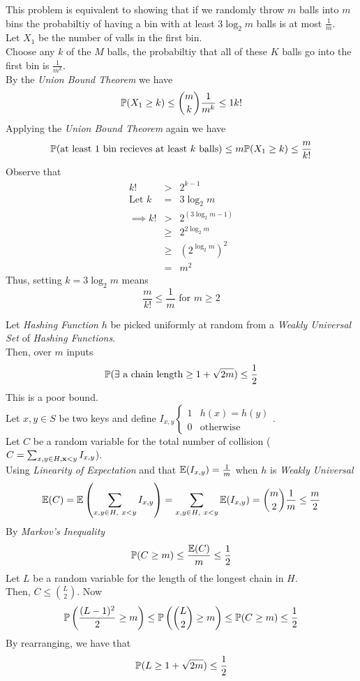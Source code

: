 \documentclass[11pt,a4paper]{article}
\begin{document}
This problem is equivalent to showing that if we randomly throw $m$ balls into $m$ bins the probabiltiy of having a bin with at least $3\log_2 m$ balls is at most $\frac1m$.\\
Let $X_1$ be the number of valls in the first bin.\\
Choose any $k$ of the $M$ balls, the probabiltiy that all of these $K$ balls go into the first bin is $\frac1{m^k}$.\\
By the \textit{Union Bound Theorem} we have
$$\mathbb{P}(X_1\geq k)\leq{m\choose k}\frac{1}{m^k}\leq1{k!}$$
Applying the \textit{Union Bound Theorem} again we have
$$\mathbb{P}(\text{at least 1 bin recieves at least }k\text{ balls})\leq m\mathbb{P}(X_1\geq k)\leq\frac{m}{k!}$$
Observe that
\[\begin{array}{rcl}
k!&>&2^{k-1}\\
\text{Let }k&=&3\log_2 m\\
\implies k!&>&2^{(3\log_2m-1)}\\
&\geq&2^{2\log_2 m}\\
&\geq&(2^{\log_2 m})^2\\
&=&m^2
\end{array}\]
Thus, setting $k=3\log_2 m$ means
$$\frac{m}{k!}\leq\frac1m\text{ for }m\geq2$$
\proved

Let \textit{Hashing Function} $h$ be picked uniformly at random from a \textit{Weakly Universal Set} of \textit{Hashing Functions}.\\
Then, over $m$ inputs
$$\mathbb{P}(\exists\text{ a chain length}\geq1+\sqrt{2m})\leq\frac12$$
\nb This is a poor bound.\\

Let $x,y\in S$ be two keys and define $I_{x,y}\begin{cases}1&h(x)=h(y)\\0&\text{otherwise}\end{cases}$.\\
Let $C$ be a random variable for the total number of collision (\ie $C=\sum_{x,y\in H, \textbf{x}<y}I_{x,y}$).\\
Using \textit{Linearity of Expectation} and that $\mathbb{E}(I_{x,y})=\frac1m$ when $h$ is \textit{Weakly Universal}
$$\expect(C)=\expect\left(\sum_{x,y\in H,\ x<y}I_{x,y}\right)=\sum_{x,y\in H,\ x<y}\expect(I_{x,y})={m\choose2}\frac1m\leq\frac{m}{2}$$
By \textit{Markov's Inequality}
$$\mathbb{P}(C\geq m)\leq\frac{\mathbb{E}(C)}m\leq\frac12$$
Let $L$ be a random variable for the length of the longest chain in $H$.\\
Then, $C\leq{L\choose2}$.
Now
$$\mathbb{P}\left(\frac{(L-1)^2}{2}\geq m\right)\leq\mathbb{P}\left({L\choose2}\geq m\right)\leq\mathbb{P}(C\geq m)\leq\frac12$$
By rearranging, we have that
$$\mathbb{P}(L\geq1+\sqrt{2m})\leq\frac12$$
\end{document}
